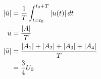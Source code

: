 \documentclass[../../document.tex]{subfiles}
\begin{document}
\begin{equation*}
    \begin{split}
        \left\lvert \bar{u} \right\rvert &= \frac{1}{T} \int_{t=t_{\textrm{0}}}^{t_{\textrm{0}} + T} \left\lvert u (t) \right\rvert  dt\\
        \bar{u} &= \frac{ \left\lvert A \right\rvert }{T}\\
        \left\lvert \bar{u} \right\rvert &= \frac{ \left\lvert A_{\textrm{1}} \right\rvert + \left\lvert A_{\textrm{2}} \right\rvert + \left\lvert A_{\textrm{3}} \right\rvert + \left\lvert A_{\textrm{4}} \right\rvert }{ T }\\
        &= \frac{3}{4} U_{\textrm{0}}
    \end{split}
\end{equation*}
\end{document}
